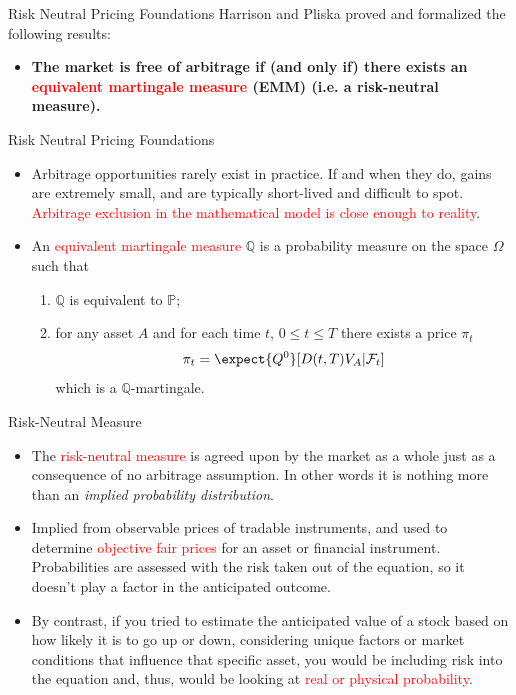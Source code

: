 \documentclass{beamer}
\begin{document}
	\begin{frame}{Risk Neutral Pricing Foundations}
	Harrison and Pliska proved and formalized the following results:
	\begin{itemize}
		\item \textbf{The market is free of arbitrage if (and only if) there exists an \textcolor{red}{equivalent martingale measure} (EMM) (i.e. a risk-neutral measure).}
	\end{itemize}
	\vfill
	\end{frame}

\begin{frame}{Risk Neutral Pricing Foundations}
	\begin{itemize}
		\item Arbitrage opportunities rarely exist in practice. If and when they do, gains are extremely small, and are typically short-lived and difficult to spot. \textcolor{red}{Arbitrage exclusion in the mathematical model is close enough to reality}.
		\item An \textcolor{red}{equivalent martingale measure} $\mathbb{Q}$ is a probability measure on the space $\Omega$ such that
		\begin{enumerate}
			\item $\mathbb{Q}$ is equivalent to $\mathbb{P}$;
			\item for any asset $A$ and for each time $t$, $0\le t\le T$ there exists a price $\pi_t$
			\begin{equation*}
				\pi_t = \expect{Q^0}[D(t,T)V_A|\mathcal{F}_t]
			\end{equation*}
			which is a $\mathbb{Q}$-martingale.
		\end{enumerate}
	\end{itemize}
\end{frame}

\begin{frame}{Risk-Neutral Measure}
	\begin{itemize}
		\item<1->The \textcolor{red}{risk-neutral measure} is agreed upon by the market as a whole just as a consequence of no arbitrage assumption.
		In other words it is nothing more than an \emph{implied probability distribution}.
		\item<2-> Implied from observable prices of tradable instruments, and used to determine \textcolor{red}{objective fair prices} for an asset or financial instrument. Probabilities are assessed with the risk taken out of the equation, so it doesn’t play a factor in the anticipated outcome.
		\item<3-> By contrast, if you tried to estimate the anticipated value of a stock based on how likely it is to go up or down, considering unique factors or market conditions that influence that specific asset, you would be including risk into the equation and, thus, would be looking at \textcolor{red}{real or physical probability}.
	\end{itemize}
\end{frame}
\end{document}
